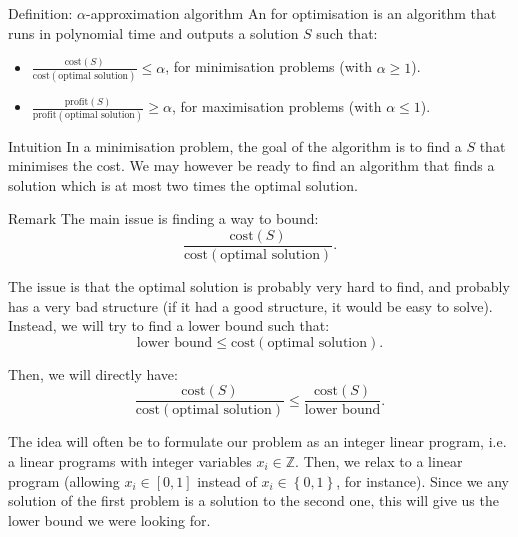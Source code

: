 \documentclass[a4paper]{article}
\begin{document}
\begin{parag}{Definition: $\alpha$-approximation algorithm}
    An  for optimisation is an algorithm that runs in polynomial time and outputs a solution $S$ such that: 
    \begin{itemize}
        \item $\displaystyle \frac{\text{cost}\left(S\right)}{\text{cost}\left(\text{optimal solution}\right)} \leq \alpha$, for minimisation problems (with $\alpha \geq 1$).
        \item $\displaystyle \frac{\text{profit}\left(S\right)}{\text{profit}\left(\text{optimal solution}\right)} \geq \alpha$, for maximisation problems (with $\alpha \leq 1$).
    \end{itemize}

    \begin{subparag}{Intuition}
        In a minimisation problem, the goal of the algorithm is to find a $S$ that minimises the cost. We may however be ready to find an algorithm that finds a solution which is at most two times the optimal solution.
    \end{subparag}

    \begin{subparag}{Remark}
        The main issue is finding a way to bound: 
        \[\frac{\text{cost}\left(S\right)}{\text{cost}\left(\text{optimal solution}\right)}.\]

        The issue is that the optimal solution is probably very hard to find, and probably has a very bad structure (if it had a good structure, it would be easy to solve). Instead, we will try to find a lower bound such that:
        \[\text{lower bound} \leq \text{cost}\left(\text{optimal solution}\right).\]

        Then, we will directly have:
        \[\frac{\text{cost}\left(S\right)}{\text{cost}\left(\text{optimal solution}\right)} \leq \frac{\text{cost}\left(S\right)}{\text{lower bound}}.\]

        The idea will often be to formulate our problem as an integer linear program, i.e. a linear programs with integer variables $x_i \in \mathbb{Z}$. Then, we relax to a linear program (allowing $x_i \in \left[0, 1\right]$ instead of $x_i \in \left\{0, 1\right\}$, for instance). Since we any solution of the first problem is a solution to the second one, this will give us the lower bound we were looking for.
    \end{subparag}
\end{parag}
\end{document}
